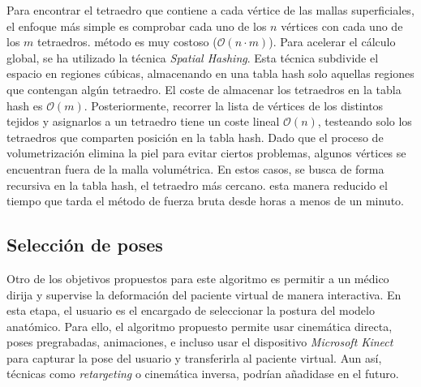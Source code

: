 Para encontrar el tetraedro que contiene a cada vértice de las mallas superficiales, el enfoque más simple es comprobar cada uno de los $n$ vértices con cada uno de los $m$ tetraedros. 
%
  método es muy costoso ($\mathcal{O}(n \cdot m)$). Para acelerar el cálculo global, se ha utilizado la técnica \emph{Spatial Hashing}\cite{Teschner2003}. Esta técnica subdivide el espacio en regiones cúbicas, almacenando en una \ac{tabla hash} solo aquellas regiones que contengan algún tetraedro. El coste de almacenar los tetraedros en la \ac{tabla hash} es $\mathcal{O}(m)$. Posteriormente, recorrer la lista de vértices de los distintos tejidos y asignarlos a un tetraedro tiene un coste lineal $\mathcal{O}(n)$, testeando solo los tetraedros que comparten posición en la \ac{tabla hash}. Dado que el proceso de volumetrización elimina la piel para evitar ciertos problemas, algunos vértices se encuentran fuera de la malla volumétrica. En estos casos, se busca de forma recursiva en la \ac{tabla hash}, el tetraedro más cercano.
  esta manera   reducido el tiempo que tarda el método de fuerza bruta desde horas a menos de un minuto.




\subsection{Selección de poses}
\label{posing:Poses}
%
Otro de los objetivos propuestos para este algoritmo es  permitir a un médico  dirija y supervise la deformación del paciente virtual de manera interactiva. %
En esta etapa, el usuario es el encargado de seleccionar la postura del modelo anatómico. Para ello, el algoritmo propuesto permite usar cinemática directa, poses pregrabadas, animaciones, e incluso usar el dispositivo \emph{Microsoft Kinect}~\cite{shotton2013} para capturar la pose del usuario y transferirla al paciente virtual. Aun así, técnicas como \emph{retargeting} \cite{7581666} o cinemática inversa, podrían añadidase en el futuro. %

